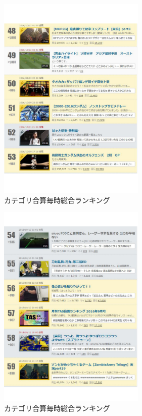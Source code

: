 \begin{figure}[htb]
\centering
\includegraphics[width=7cm]{r09.pdf}
\caption{カテゴリ合算毎時総合ランキング}\label{abc}
\end{figure}

\begin{figure}[htb]
\centering
\includegraphics[width=7cm]{r10.pdf}
\caption{カテゴリ合算毎時総合ランキング}\label{abd}
\end{figure}

